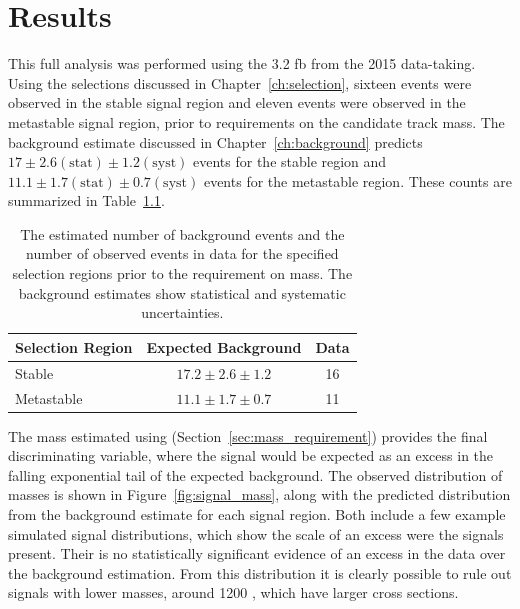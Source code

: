 \chapter{Results}

\label{ch:results}

This full analysis was performed using the 3.2 fb from the 2015 data-taking.
Using the selections discussed in Chapter~\ref{ch:selection}, sixteen events were observed in the stable signal region and eleven events were observed in the metastable signal region, prior to requirements on the candidate track mass.
The background estimate discussed in Chapter~\ref{ch:background} predicts $17 \pm 2.6 (\mathrm{stat}) \pm 1.2 (\mathrm{syst})$ events for the stable region and $11.1 \pm 1.7 (\mathrm{stat}) \pm 0.7 (\mathrm{syst})$ events for the metastable region. 
These counts are summarized in Table~\ref{tab:yields}.

\begin{table}
  \begin{center}
  \begin{tabular}{lcc}
  \hline
  Selection Region & Expected Background & Data \\
  \hline
  Stable     & $17.2 \pm 2.6 \pm 1.2$ & 16 \\
  Metastable & $11.1 \pm 1.7 \pm 0.7$ & 11 \\
  \hline
  \end{tabular}
  \end{center}
  \caption{The estimated number of background events and the number of observed events in data for the specified selection regions prior to the requirement on mass. The background estimates show statistical and systematic uncertainties.}
  \label{tab:yields}
\end{table}

The mass estimated using \dedx (Section~\ref{sec:mass_requirement}) provides the final discriminating variable, where the signal would be expected as an excess in the falling exponential tail of the expected background.
The observed distribution of masses is shown in Figure~\ref{fig:signal_mass}, along with the predicted distribution from the background estimate for each signal region.
Both include a few example simulated signal distributions, which show the scale of an excess were the \rhadron signals present.
Their is no statistically significant evidence of an excess in the data over the background estimation.
From this distribution it is clearly possible to rule out signals with lower masses, around 1200 \GeV, which have larger cross sections.


